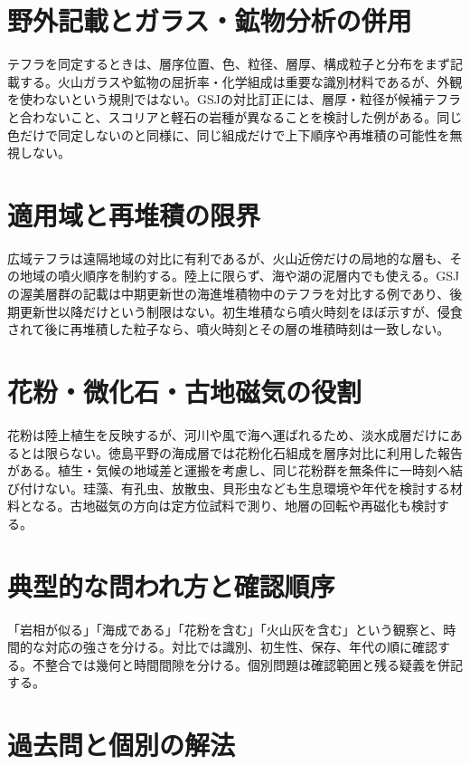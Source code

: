 \section{野外記載とガラス・鉱物分析の併用}
\label{theory:stratigraphy:identify}
テフラを同定するときは、層序位置、色、粒径、層厚、構成粒子と分布をまず記載する。火山ガラスや鉱物の屈折率・化学組成は重要な識別材料であるが、外観を使わないという規則ではない。GSJの対比訂正には、層厚・粒径が候補テフラと合わないこと、スコリアと軽石の岩種が異なることを検討した例がある。同じ色だけで同定しないのと同様に、同じ組成だけで上下順序や再堆積の可能性を無視しない。\cite{strat_gsj_tephra2013}

\section{適用域と再堆積の限界}
\label{theory:stratigraphy:scope}
広域テフラは遠隔地域の対比に有利であるが、火山近傍だけの局地的な層も、その地域の噴火順序を制約する。陸上に限らず、海や湖の泥層内でも使える。GSJの渥美層群の記載は中期更新世の海進堆積物中のテフラを対比する例であり、後期更新世以降だけという制限はない。初生堆積なら噴火時刻をほぼ示すが、侵食されて後に再堆積した粒子なら、噴火時刻とその層の堆積時刻は一致しない。\cite{strat_gsj_atsumi}

\section{花粉・微化石・古地磁気の役割}
\label{theory:stratigraphy:pollen}
花粉は陸上植生を反映するが、河川や風で海へ運ばれるため、淡水成層だけにあるとは限らない。徳島平野の海成層では花粉化石組成を層序対比に利用した報告がある。植生・気候の地域差と運搬を考慮し、同じ花粉群を無条件に一時刻へ結び付けない。珪藻、有孔虫、放散虫、貝形虫なども生息環境や年代を検討する材料となる。古地磁気の方向は定方位試料で測り、地層の回転や再磁化も検討する。\cite{strat_pollen_tokushima}

\section{典型的な問われ方と確認順序}
「岩相が似る」「海成である」「花粉を含む」「火山灰を含む」という観察と、時間的な対応の強さを分ける。対比では識別、初生性、保存、年代の順に確認する。不整合では幾何と時間間隙を分ける。個別問題は確認範囲と残る疑義を併記する。
\section{過去問と個別の解法}


